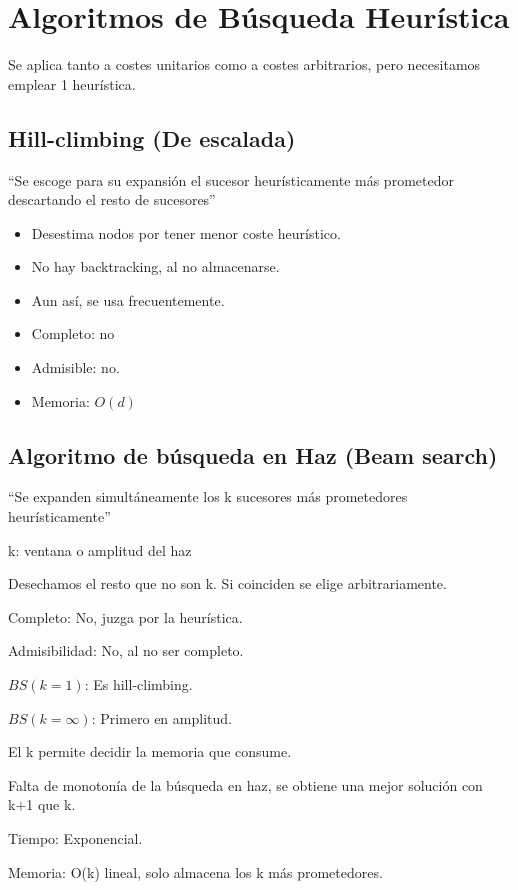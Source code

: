 \documentclass[12pt, twoside, openright]{report} %
\begin{document}
\section{Algoritmos de Búsqueda Heurística}

Se aplica tanto a costes unitarios como a costes arbitrarios, pero
necesitamos emplear 1 heurística.

\subsection{Hill-climbing (De escalada)}

\enquote{Se escoge para su expansión el sucesor heurísticamente más
prometedor descartando el resto de sucesores}

\begin{itemize}
	\item Desestima nodos por tener menor coste heurístico.
	\item No hay backtracking, al no almacenarse.
	\item Aun así, se usa frecuentemente.
	\item Completo: no
	\item Admisible: no.
	\item Memoria: \(O(d)\)
\end{itemize}

\subsection{Algoritmo de búsqueda en Haz (Beam search)}

\enquote{Se expanden simultáneamente los k sucesores más prometedores
heurísticamente}

k: ventana o amplitud del haz

Desechamos el resto que no son k. Si coinciden se elige
arbitrariamente.

Completo: No, juzga por la heurística.

Admisibilidad: No, al no ser completo.

\(BS(k=1)\): Es hill-climbing.

\(BS(k= \infty)\): Primero en amplitud.

El k permite decidir la memoria que consume.

Falta de monotonía de la búsqueda en haz, se obtiene una mejor
solución con k+1 que k.

Tiempo: Exponencial.

Memoria: O(k) lineal, solo almacena los k más prometedores.
\pagebreak
\end{document}
